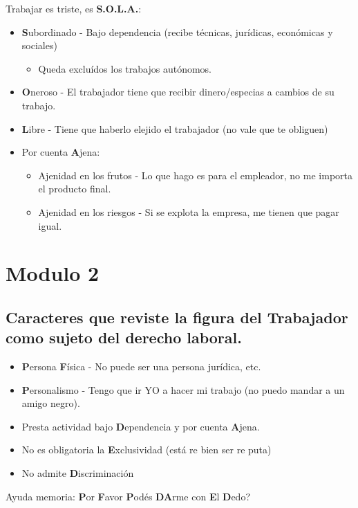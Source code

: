 \documentclass[spanish,12pt,a4paper,titlepage]{report}
\begin{document}
Trabajar es triste, es \textbf{S.O.L.A.}:
\begin{itemize}
\item \textbf{S}ubordinado - Bajo dependencia (recibe técnicas, jurídicas, económicas y sociales)
  \begin{itemize}
  \item Queda excluídos los trabajos autónomos.
  \end{itemize}
\item \textbf{O}neroso - El trabajador tiene que recibir dinero/especias a cambios de su trabajo.
\item \textbf{L}ibre - Tiene que haberlo elejido el trabajador (no vale que te obliguen)
\item Por cuenta \textbf{A}jena:
  \begin{itemize}
  \item Ajenidad en los frutos - Lo que hago es para el empleador, no me importa el producto final.
  \item Ajenidad en los riesgos - Si se explota la empresa, me tienen que pagar igual.
  \end{itemize}
\end{itemize}

\section{Modulo 2}

\subsection{Caracteres que reviste la figura del Trabajador como sujeto del derecho laboral.}

\begin{itemize}
\item \textbf{P}ersona \textbf{F}ísica - No puede ser una persona jurídica, etc.
\item \textbf{P}ersonalismo - Tengo que ir YO a hacer mi trabajo (no puedo mandar a un amigo negro).
\item Presta actividad bajo \textbf{D}ependencia y por cuenta \textbf{A}jena.
\item No es obligatoria la \textbf{E}xclusividad (está re bien ser re puta)
\item No admite \textbf{D}iscriminación
\end{itemize}

Ayuda memoria: \textbf{P}or \textbf{F}avor \textbf{P}odés \textbf{DA}rme con \textbf{E}l \textbf{D}edo?
\end{document}
